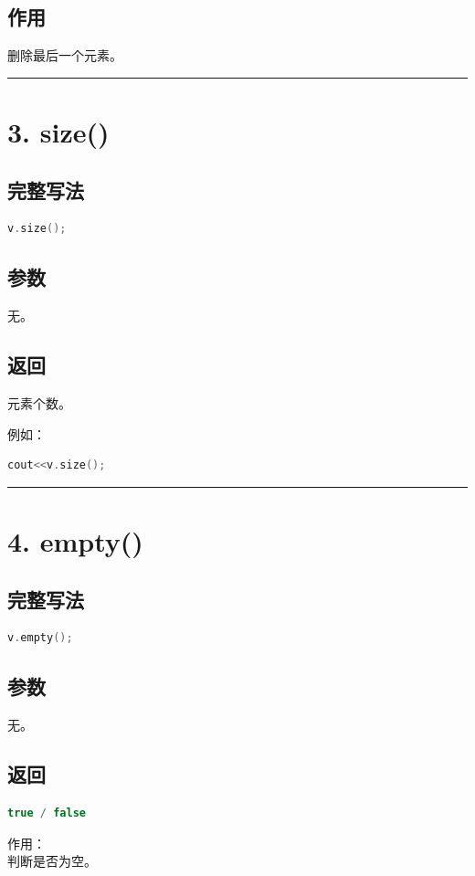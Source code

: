 \documentclass[9pt,twocolumn]{extarticle}
\begin{document}
\subsection{作用}
删除最后一个元素。

\noindent\rule{\linewidth}{0.4pt}

\section{3. size()}

\subsection{完整写法}
\begin{lstlisting}[language=C++]
v.size();
\end{lstlisting}

\subsection{参数}
无。

\subsection{返回}
元素个数。

例如：
\begin{lstlisting}[language=C++]
cout<<v.size();
\end{lstlisting}

\noindent\rule{\linewidth}{0.4pt}

\section{4. empty()}

\subsection{完整写法}
\begin{lstlisting}[language=C++]
v.empty();
\end{lstlisting}

\subsection{参数}
无。

\subsection{返回}
\begin{lstlisting}[language=C++]
true / false
\end{lstlisting}
作用：\\
判断是否为空。
\end{document}
